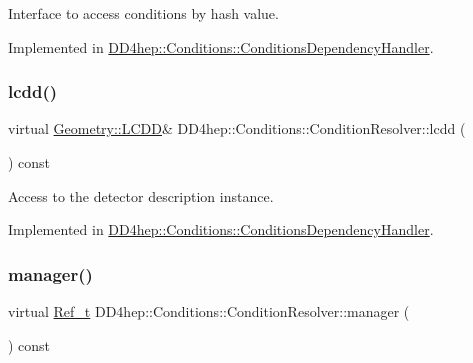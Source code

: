 Interface to access conditions by hash value. 



Implemented in \hyperlink{class_d_d4hep_1_1_conditions_1_1_conditions_dependency_handler_a05c865a8a52716dfabf10101e849182b}{D\+D4hep\+::\+Conditions\+::\+Conditions\+Dependency\+Handler}.

\hypertarget{class_d_d4hep_1_1_conditions_1_1_condition_resolver_a9413afdddefecd04036fd7f7b8356fca}{}\label{class_d_d4hep_1_1_conditions_1_1_condition_resolver_a9413afdddefecd04036fd7f7b8356fca} 
\subsubsection{\texorpdfstring{lcdd()}{lcdd()}}
{\footnotesize\ttfamily virtual \hyperlink{class_d_d4hep_1_1_geometry_1_1_l_c_d_d}{Geometry\+::\+L\+C\+DD}\& D\+D4hep\+::\+Conditions\+::\+Condition\+Resolver\+::lcdd (\begin{DoxyParamCaption}{ }\end{DoxyParamCaption}) const\hspace{0.3cm}{\ttfamily [pure virtual]}}



Access to the detector description instance. 



Implemented in \hyperlink{class_d_d4hep_1_1_conditions_1_1_conditions_dependency_handler_a75cdb86dde27a5fc974275a5eb7bc786}{D\+D4hep\+::\+Conditions\+::\+Conditions\+Dependency\+Handler}.

\hypertarget{class_d_d4hep_1_1_conditions_1_1_condition_resolver_ab8c95a13c7c20b35ab746e6fcc8c420f}{}\label{class_d_d4hep_1_1_conditions_1_1_condition_resolver_ab8c95a13c7c20b35ab746e6fcc8c420f} 
\subsubsection{\texorpdfstring{manager()}{manager()}}
{\footnotesize\ttfamily virtual \hyperlink{group___d_d4_h_e_p___g_e_o_m_e_t_r_y_ga40af83be6718bb8828a3d83dc7f8c930}{Ref\+\_\+t} D\+D4hep\+::\+Conditions\+::\+Condition\+Resolver\+::manager (\begin{DoxyParamCaption}{ }\end{DoxyParamCaption}) const\hspace{0.3cm}{\ttfamily [pure virtual]}}



